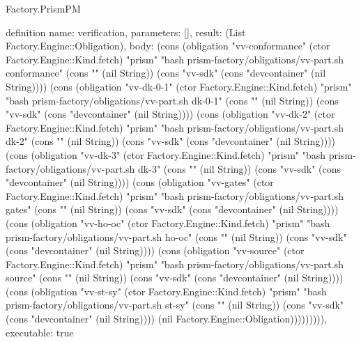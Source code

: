 \begin{lexlean}{Factory.PrismPM}
\begin{semanticmodule}
definition{
  name: verification,
  parameters: [],
  result: (List Factory.Engine::Obligation),
  body: (cons (obligation "vv-conformance" (ctor Factory.Engine::Kind.fetch) "prism" "bash prism-factory/obligations/vv-part.sh conformance" (cons "" (nil String)) (cons "vv-sdk" (cons "devcontainer" (nil String)))) (cons (obligation "vv-dk-0-1" (ctor Factory.Engine::Kind.fetch) "prism" "bash prism-factory/obligations/vv-part.sh dk-0-1" (cons "" (nil String)) (cons "vv-sdk" (cons "devcontainer" (nil String)))) (cons (obligation "vv-dk-2" (ctor Factory.Engine::Kind.fetch) "prism" "bash prism-factory/obligations/vv-part.sh dk-2" (cons "" (nil String)) (cons "vv-sdk" (cons "devcontainer" (nil String)))) (cons (obligation "vv-dk-3" (ctor Factory.Engine::Kind.fetch) "prism" "bash prism-factory/obligations/vv-part.sh dk-3" (cons "" (nil String)) (cons "vv-sdk" (cons "devcontainer" (nil String)))) (cons (obligation "vv-gates" (ctor Factory.Engine::Kind.fetch) "prism" "bash prism-factory/obligations/vv-part.sh gates" (cons "" (nil String)) (cons "vv-sdk" (cons "devcontainer" (nil String)))) (cons (obligation "vv-ho-oc" (ctor Factory.Engine::Kind.fetch) "prism" "bash prism-factory/obligations/vv-part.sh ho-oc" (cons "" (nil String)) (cons "vv-sdk" (cons "devcontainer" (nil String)))) (cons (obligation "vv-source" (ctor Factory.Engine::Kind.fetch) "prism" "bash prism-factory/obligations/vv-part.sh source" (cons "" (nil String)) (cons "vv-sdk" (cons "devcontainer" (nil String)))) (cons (obligation "vv-st-sy" (ctor Factory.Engine::Kind.fetch) "prism" "bash prism-factory/obligations/vv-part.sh st-sy" (cons "" (nil String)) (cons "vv-sdk" (cons "devcontainer" (nil String)))) (nil Factory.Engine::Obligation))))))))),
  executable: true
}


\end{semanticmodule}
\end{lexlean}
